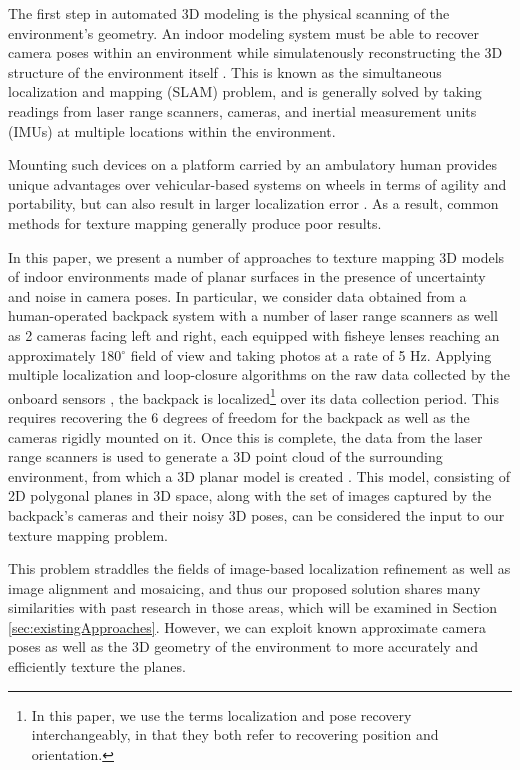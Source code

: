 \documentclass[10pt,twocolumn,letterpaper]{article}
\begin{document}
The first step in automated 3D modeling is the physical scanning of
the environment's geometry. An indoor modeling system must be able to
recover camera poses within an environment while simulatenously
reconstructing the 3D structure of the environment itself
\cite{chen2010indoor, hz, kua2012loopclosure, liu2010indoor}. This is
known as the simultaneous localization and mapping (SLAM) problem, and
is generally solved by taking readings from laser range scanners,
cameras, and inertial measurement units (IMUs) at multiple locations
within the environment.

Mounting such devices on a platform carried by an ambulatory human
provides unique advantages over vehicular-based systems on wheels in
terms of agility and portability, but can also result in larger
localization error \cite{liu2010indoor}. As a result, common methods
for texture mapping generally produce poor results.

In this paper, we present a number of approaches to texture mapping 3D
models of indoor environments made of planar surfaces in the presence
of uncertainty and noise in camera poses. In particular, we consider
data obtained from a human-operated backpack system with a number of
laser range scanners as well as 2 cameras facing left and right, each
equipped with fisheye lenses reaching an approximately 180$^{\circ}$
field of view and taking photos at a rate of 5 Hz. Applying multiple
localization and loop-closure algorithms on the raw data collected by
the onboard sensors \cite{chen2010indoor, kua2012loopclosure,
  liu2010indoor}, the backpack is localized\footnote{In this paper, we
  use the terms localization and pose recovery interchangeably, in
  that they both refer to recovering position and orientation.}  over
its data collection period. This requires recovering the 6 degrees of
freedom for the backpack as well as the cameras rigidly mounted on
it. Once this is complete, the data from the laser range scanners is
used to generate a 3D point cloud of the surrounding environment, from which a
3D planar model is created \cite{sanchez2012point}. This model, consisting of 2D
polygonal planes in 3D space, along with the set of images captured by
the backpack's cameras and their noisy 3D poses, can be considered the
input to our texture mapping problem.

This problem straddles the fields of image-based localization
refinement as well as image alignment and mosaicing, and thus our
proposed solution shares many similarities with past research in those
areas, which will be examined in Section
\ref{sec:existingApproaches}. However, we can exploit known
approximate camera poses as well as the 3D geometry of the environment
to more accurately and efficiently texture the planes.
\end{document}

